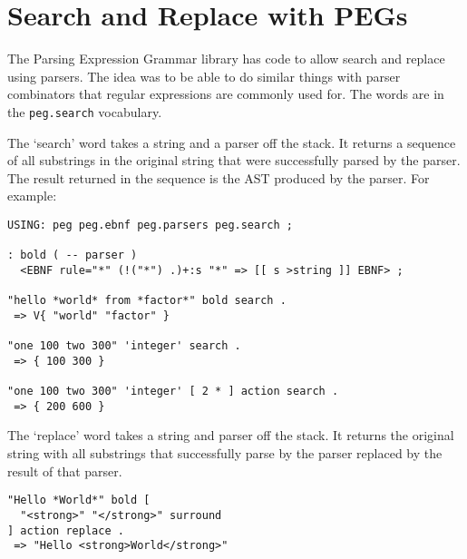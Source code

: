 \chapter{Search and Replace with PEGs}\label{seachreplace}

The Parsing Expression Grammar library has code to allow search and replace using parsers. The idea was to be able to do similar things with parser combinators that regular expressions are commonly used for. The words are in the \texttt{peg.search} vocabulary.


The `search' word takes a string and a parser off the stack. It returns a sequence of all substrings in the original string that were successfully parsed by the parser. The result returned in the sequence is the AST produced by the parser. For example:

\begin{verbatim}
USING: peg peg.ebnf peg.parsers peg.search ;

: bold ( -- parser )
  <EBNF rule="*" (!("*") .)+:s "*" => [[ s >string ]] EBNF> ;

"hello *world* from *factor*" bold search . 
 => V{ "world" "factor" } 

"one 100 two 300" 'integer' search .
 => { 100 300 }

"one 100 two 300" 'integer' [ 2 * ] action search .
 => { 200 600 }
\end{verbatim}


The `replace' word takes a string and parser off the stack. It returns the original string with all substrings that successfully parse by the parser replaced by the result of that parser.

\begin{verbatim}
"Hello *World*" bold [ 
  "<strong>" "</strong>" surround
] action replace .
 => "Hello <strong>World</strong>"
\end{verbatim}



